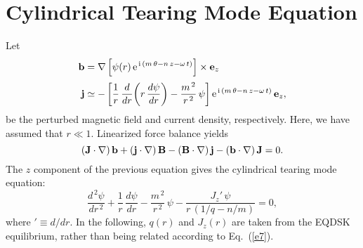 \documentclass[notitlepage,12pt]{article}
\begin{document}
\section{Cylindrical Tearing Mode Equation}
Let 
\begin{align}
{\bf b} &= \nabla\left[\psi(r)\,{\rm e}^{\,{\rm i}\,(m\,\theta-n\,z-\omega\,t)}\right]\times{\bf e}_z\,\\[0.5ex]
{\bf j} &\simeq -\left[\frac{1}{r}\,\frac{d}{dr}\!\left(r\,\frac{d\psi}{dr}\right)-\frac{m^{\,2}}{r^{\,2}}\,\psi\right]{\rm e}^{\,{\rm i}\,(m\,\theta-n\,z-\omega\,t)}\,{\bf e}_z,
\end{align}
be the perturbed magnetic field and current density, respectively. Here, we have assumed that  $r\ll 1$. Linearized  force balance
yields
\begin{equation}
({\bf J}\cdot\nabla)\,{\bf b} +({\bf j}\cdot\nabla)\,{\bf B} -({\bf B}\cdot\nabla)\,{\bf j} - ({\bf b}\cdot\nabla)\,{\bf J} = 0.
\end{equation}
The $z$ component of the previous equation gives the cylindrical tearing mode equation:
\begin{equation}
\frac{d^{\,2}\psi}{dr^{\,2}}+\frac{1}{r}\,\frac{d\psi}{dr} - \frac{m^{\,2}}{r^{\,2}}\,\psi - \frac{J_z'\,\psi}{r\,(1/q-n/m)} = 0,
\end{equation}
where $'\equiv d/dr$. In the following, $q(r)$ and $J_z(r)$ are taken from the EQDSK equilibrium, rather than being related
according to Eq.~(\ref{e7}). 
\end{document}

